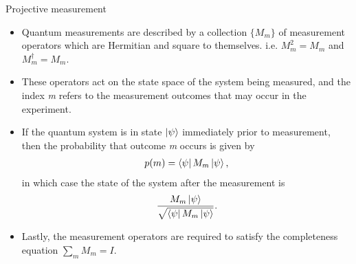 \documentclass[handout, 10 pt]{beamer}
\begin{document}
    


\begin{frame}{Projective measurement}
\begin{itemize}
    \item Quantum measurements are described by a collection $\{M_m\}$ of measurement operators which are Hermitian and square to themselves. i.e. $M_m^2=M_m$ and $M_m^\dagger=M_m$.
    \pause
    \item These operators act on the state space of the system being measured, and the index {\emph{m}} refers to the measurement outcomes that may occur in the experiment. 
    \pause
    \item If the quantum system is in state $\ket{\psi}$ immediately prior to measurement, then the probability that outcome {\emph{m}} occurs is given by 
    \begin{gather*}
       p(m)=\bra{\psi}M_m \ket{\psi},
    \end{gather*}
    in which case the state of the system after the measurement is
    \begin{gather*}
        \frac{M_m \ket{\psi}}{\sqrt{\bra{\psi}M_m \ket{\psi}}}.
    \end{gather*}
    \pause
    \item Lastly, the measurement operators are required to satisfy the completeness equation $\sum\limits_m M_m =I$.   
\end{itemize}
\end{frame}
\end{document}
